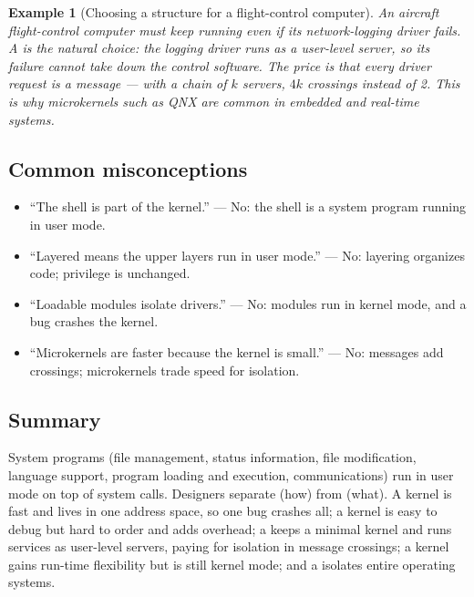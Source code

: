 \documentclass[11pt]{article}
\newtheorem{example}{Example}
\begin{document}
\begin{example}[Choosing a structure for a flight-control computer]
An aircraft flight-control computer must keep running even if its
network-logging driver fails. A  is the natural choice: the
logging driver runs as a user-level server, so its failure cannot take down the
control software. The price is that every driver request is a message --- with
a chain of $k$ servers, $4k$ crossings instead of 2. This is why microkernels
such as QNX are common in embedded and real-time systems.
\end{example}

\subsection*{Common misconceptions}

\begin{itemize}
  \item ``The shell is part of the kernel.'' --- No: the shell is a system
        program running in user mode.
  \item ``Layered means the upper layers run in user mode.'' --- No: layering
        organizes code; privilege is unchanged.
  \item ``Loadable modules isolate drivers.'' --- No: modules run in kernel
        mode, and a bug crashes the kernel.
  \item ``Microkernels are faster because the kernel is small.'' --- No:
        messages add crossings; microkernels trade speed for isolation.
\end{itemize}

\subsection*{Summary}

System programs (file management, status information, file modification,
language support, program loading and execution, communications) run in user
mode on top of system calls. Designers separate  (how) from
 (what). A  kernel is fast and lives in one address
space, so one bug crashes all; a  kernel is easy to debug but hard
to order and adds overhead; a  keeps a minimal kernel and
runs services as user-level servers, paying for isolation in message
crossings; a  kernel gains run-time flexibility but is still kernel
mode; and a  isolates entire operating systems.
\end{document}
